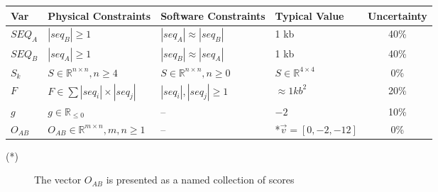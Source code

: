 \documentclass[12pt]{article}
\begin{document}

\begin{table}[!h]
  \caption{Input Variables} \label{TblInputVar}
  \renewcommand{\arraystretch}{1.2}
\noindent \begin{longtable*}{l l l l c} 
  \toprule
  \textbf{Var} & \textbf{Physical Constraints} & \textbf{Software Constraints} &
                             \textbf{Typical Value} & \textbf{Uncertainty}\\
  \midrule 
  $SEQ_A$ & $|{seq_B}| \geq 1$ & $|seq_A| \approx |seq_B|$ & 1 kb & 40\%
  \\
  $SEQ_B$ & $|{seq_A}| \geq 1$ & $|seq_B| \approx |seq_A|$ & 1 kb & 40\%
  \\
  $S_k$ & $S \in \mathbb{R}^{n \times n}, n \geq 4$ & $S \in \mathbb{R}^{n \times n}, n \geq 0$ & $S \in \mathbb{R}^{4 \times 4}$& 0\%
  \\
  $F$ & $F \in \sum|seq_i| \times |seq_j|$ & $|seq_i|, |seq_j| \geq 1$ & $\approx 1 kb^2$ & 20\%
  \\
  $g$ & $g \in \mathbb{R}_{\leq 0}$ & -- & $-2$ & 10\%
  \\
  $O_{AB}$ & $O_{AB} \in \mathbb{R}^{m \times n}, m,n \geq 1$ & -- & *$\vec{v} = [0,-2,-12]$ & 0\%
  \\
  \bottomrule
\end{longtable*}
\end{table}

\noindent 
\begin{description}
\item[(*)] The vector $O_{AB}$ is presented as a named collection of scores
\end{description}


\end{document}
